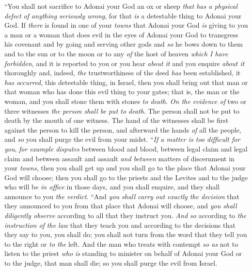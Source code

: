 \begin{biblechapter} %
\verse “You shall not sacrifice to Adonai your God an ox or sheep \textit{that has a physical defect} \textit{of anything seriously wrong}, for that \textit{is} a detestable thing to Adonai your God.
\verse If \textit{there} is found in one of your \textit{towns} that Adonai your God \textit{is} giving to you a man or a woman that does evil in the eyes of Adonai your God to transgress his covenant
\verse and by going and serving other gods and \textit{so} he bows down to them and to the sun or to the moon or to any \textit{of} the host of heaven \textit{which I have forbidden},
\verse and it is reported to you or you hear \textit{about it} and you enquire \textit{about it} thoroughly and, indeed, \textit{the} trustworthiness of the deed \textit{has} been established, it \textit{has occurred}, this detestable thing, in Israel,
\verse then you shall bring out that man or that woman who has done this evil thing to your gates; that is, the man or the woman, and you shall stone them with stones \textit{to death}.
\verse \textit{On the evidence of} two or three witnesses \textit{the person shall be put to death}. The person shall not be put to death by the mouth of one witness.
\verse The hand of the witnesses shall be first against the person to kill the person, and afterward the hands \textit{of} all the people, and \textit{so} you shall purge the evil from your midst.
\verse “\textit{If a matter is too difficult for you}, \textit{for example disputes} between blood and blood, between legal claim and legal claim and between assault and assault \textit{and between} matters of discernment in your \textit{towns}, then you shall get up and you shall go to the place that Adonai your God will choose;
\verse then you shall go to the priests and the Levites and to the judge who will be \textit{in office} in those days, and you shall enquire, and they shall announce to you \textit{the verdict}.
\verse “And \textit{you shall carry out exactly the decision} that they announced to you from that place that Adonai will choose, and \textit{you shall diligently observe} according to all that they instruct you.
\verse \textit{And so} according to \textit{the instruction of the law} that they teach you and according to the decisions that they say to you, you shall do; you shall not turn from the word that they tell you to the right or \textit{to the} left.
\verse And the man who treats with contempt \textit{so as} not to listen to the priest \textit{who} \textit{is} standing to minister on behalf of Adonai your God or to the judge, that man shall die; so you shall purge the evil from Israel.

\end{biblechapter}
